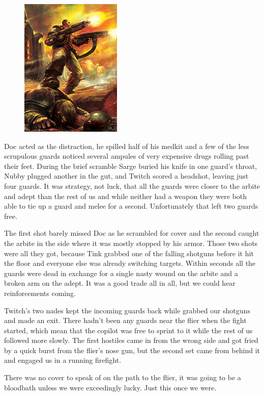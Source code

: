 \begin{figure}
	\begin{center}
		\includegraphics[width=\figwidth]{pics/9/38.png}
	\end{center}
\end{figure}
Doc acted as the distraction, he spilled half of his medkit and a few of the less scrupulous guards noticed several ampules of very expensive drugs rolling past their feet. 
During the brief scramble Sarge buried his knife in one guard's throat, Nubby plugged another in the gut, and Twitch scored a headshot, leaving just four guards. 
It was strategy, not luck, that all the guards were closer to the arbite and adept than the rest of us and while neither had a weapon they were both able to tie up a guard and melee for a second. 
Unfortunately that left two guards free. 


The first shot barely missed Doc as he scrambled for cover and the second caught the arbite in the side where it was mostly stopped by his armor. 
Those two shots were all they got, because Tink grabbed one of the falling shotguns before it hit the floor and everyone else was already switching targets. 
Within seconds all the guards were dead in exchange for a single nasty wound on the arbite and a broken arm on the adept. 
It was a good trade all in all, but we could hear reinforcements coming.

Twitch's two nades kept the incoming guards back while grabbed our shotguns and made an exit. 
There hadn't been any guards near the flier when the fight started, which mean that the copilot was free to sprint to it while the rest of us followed more slowly. 
The first hostiles came in from the wrong side and got fried by a quick burst from the flier's nose gun, but the second set came from behind it and engaged us in a running firefight. 


There was no cover to speak of on the path to the flier, it was going to be a bloodbath unless we were exceedingly lucky. 
Just this once we were.

